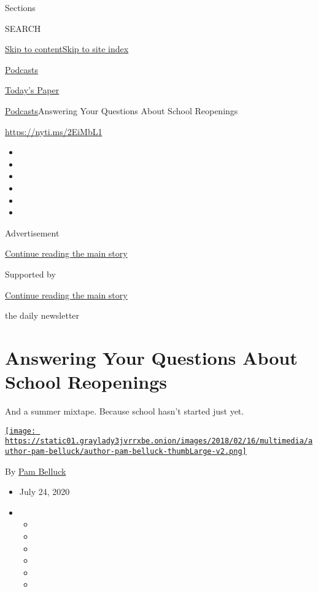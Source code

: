 Sections

SEARCH

\protect\hyperlink{site-content}{Skip to
content}\protect\hyperlink{site-index}{Skip to site index}

\href{https://www.nytimes3xbfgragh.onion/spotlight/podcasts}{Podcasts}

\href{https://myaccount.nytimes3xbfgragh.onion/auth/login?response_type=cookie\&client_id=vi}{}

\href{https://www.nytimes3xbfgragh.onion/section/todayspaper}{Today's
Paper}

\href{/spotlight/podcasts}{Podcasts}\textbar{}Answering Your Questions
About School Reopenings

\url{https://nyti.ms/2EiMbL1}

\begin{itemize}
\item
\item
\item
\item
\item
\item
\end{itemize}

Advertisement

\protect\hyperlink{after-top}{Continue reading the main story}

Supported by

\protect\hyperlink{after-sponsor}{Continue reading the main story}

the daily newsletter

\hypertarget{answering-your-questions-about-school-reopenings}{%
\section{Answering Your Questions About School
Reopenings}\label{answering-your-questions-about-school-reopenings}}

And a summer mixtape. Because school hasn't started just yet.

\href{https://www.nytimes3xbfgragh.onion/by/pam-belluck}{\texttt{[image: https://static01.graylady3jvrrxbe.onion/images/2018/02/16/multimedia/author-pam-belluck/author-pam-belluck-thumbLarge-v2.png]}}

By \href{https://www.nytimes3xbfgragh.onion/by/pam-belluck}{Pam Belluck}

\begin{itemize}
\item
  July 24, 2020
\item
  \begin{itemize}
  \item
  \item
  \item
  \item
  \item
  \item
  \end{itemize}
\end{itemize}

